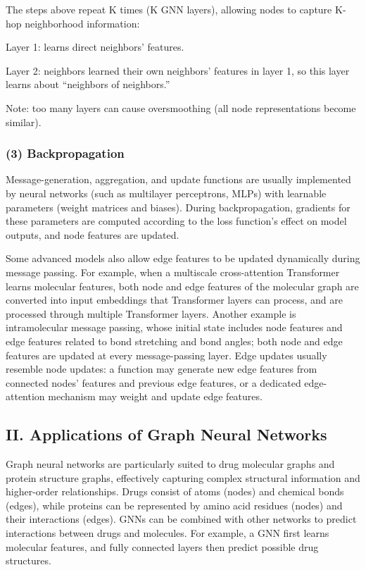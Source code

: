 The steps above repeat K times (K GNN layers), allowing nodes to capture K-hop neighborhood information:

Layer 1: learns direct neighbors' features.

Layer 2: neighbors learned their own neighbors' features in layer 1, so this layer learns about ``neighbors of neighbors.''

Note: too many layers can cause oversmoothing (all node representations become similar).

\hypertarget{backpropagation}{%
\subsubsection{(3) Backpropagation}\label{backpropagation}}

Message-generation, aggregation, and update functions are usually implemented by neural networks (such as multilayer perceptrons, MLPs) with learnable parameters (weight matrices and biases). During backpropagation, gradients for these parameters are computed according to the loss function's effect on model outputs, and node features are updated.

Some advanced models also allow edge features to be updated dynamically during message passing. For example, when a multiscale cross-attention Transformer learns molecular features, both node and edge features of the molecular graph are converted into input embeddings that Transformer layers can process, and are processed through multiple Transformer layers. Another example is intramolecular message passing, whose initial state includes node features and edge features related to bond stretching and bond angles; both node and edge features are updated at every message-passing layer. Edge updates usually resemble node updates: a function may generate new edge features from connected nodes' features and previous edge features, or a dedicated edge-attention mechanism may weight and update edge features.

\hypertarget{ii.-applications-of-graph-neural-networks}{%
\subsection{II. Applications of Graph Neural Networks}\label{ii.-applications-of-graph-neural-networks}}

Graph neural networks are particularly suited to drug molecular graphs and protein structure graphs, effectively capturing complex structural information and higher-order relationships. Drugs consist of atoms (nodes) and chemical bonds (edges), while proteins can be represented by amino acid residues (nodes) and their interactions (edges). GNNs can be combined with other networks to predict interactions between drugs and molecules. For example, a GNN first learns molecular features, and fully connected layers then predict possible drug structures.

